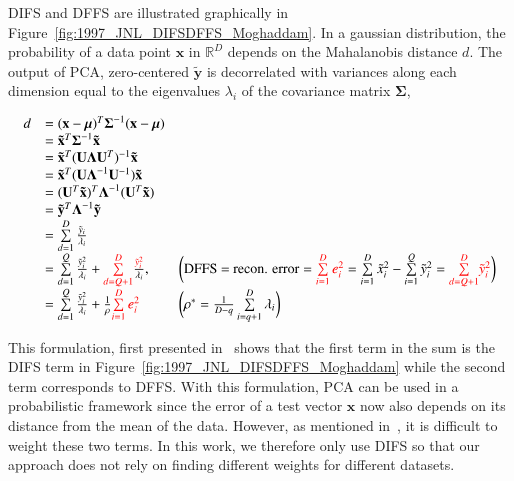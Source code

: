 DIFS and DFFS are illustrated graphically in Figure~\ref{fig:1997_JNL_DIFSDFFS_Moghaddam}.  In a gaussian distribution, the probability of a data point $\mathbf{x}$ in $\mathbb{R}^D$ depends on the Mahalanobis distance $d$.  The output of PCA, zero-centered $\mathbf{\tilde{y}}$ is decorrelated with variances along each dimension equal to the eigenvalues $\lambda_i$ of the covariance matrix $\boldsymbol\Sigma$,


\begin{equation}
\begin{array}{lllllll}
d &= (\mathbf{x}-\boldsymbol\mu)^T\boldsymbol\Sigma^{-1}(\mathbf{x}-\boldsymbol\mu)\\
&=\mathbf{\tilde{x}}^T\boldsymbol\Sigma^{-1}\mathbf{\tilde{x}}\\
&=\mathbf{\tilde{x}}^T(\mathbf{U}\boldsymbol\Lambda\mathbf{U}^T)^{-1}\mathbf{\tilde{x}}\\
&=\mathbf{\tilde{x}}^T(\mathbf{U}\boldsymbol\Lambda^{-1}\mathbf{U}^{-1})\mathbf{\tilde{x}}\\
&=(\mathbf{U}^T\mathbf{\tilde{x}})^T\boldsymbol\Lambda^{-1}(\mathbf{U}^T\mathbf{\tilde{x}})	\\
&=\mathbf{\tilde{y}}^T\boldsymbol\Lambda^{-1}\mathbf{\tilde{y}}\\
&=\sum\limits_{d=1}^D \frac{\tilde{y}_i}{\lambda_i}\\
&=\sum\limits_{d=1}^Q \frac{\tilde{y}_i^2}{\lambda_i} + {\color{red}\sum\limits_{d=Q+1}^D} \frac{{\color{red}\tilde{y}_i^2}}{\lambda_i}, \ \ \  & \bigg(\textrm{DFFS = recon. error}={\color{red}\sum\limits_{i=1}^D e_i^2} = \sum\limits_{i=1}^D \tilde{x}_i^2 - \sum\limits_{i=1}^Q \tilde{y}_i^2= {\color{red}\sum\limits_{d=Q+1}^D} {\color{red}\tilde{y}_i^2}\bigg)\\
&=\sum\limits_{d=1}^Q \frac{\tilde{y}_i^2}{\lambda_i} + \frac{1}{\rho} {\color{red}\sum\limits_{i=1}^D e_i^2} \ \ \ & \bigg(\rho^* = \frac{1}{D-q}\sum\limits_{i=q+1}^D \lambda_i\bigg)\\
\end{array}
\label{Eqn:MoghaddamLikelihood}
\end{equation}

This formulation, first presented in~\cite{1997_JNL_EigenTRK_Moghaddam} shows that the first term in the sum is the DIFS term in Figure~\ref{fig:1997_JNL_DIFSDFFS_Moghaddam} while the second term corresponds to DFFS.  With this formulation, PCA can be used in a probabilistic framework since the error of a test vector $\mathbf{x}$ now also depends on its distance from the mean of the data.  However, as mentioned in~\cite{2008_JNL_subspaceTRK_Ross}, it is difficult to weight these two terms.  In this work, we therefore only use DIFS so that our approach does not rely on finding different weights for different datasets.


